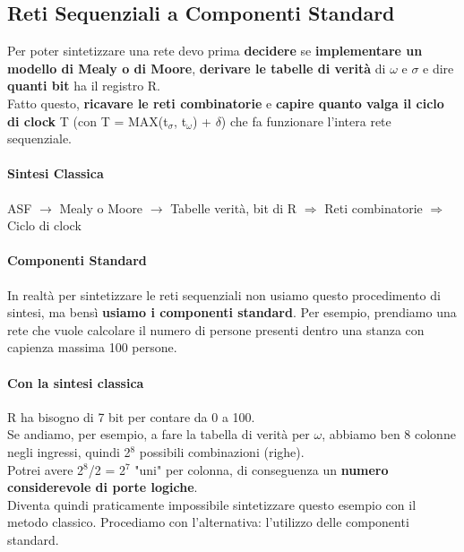 \documentclass[10pt]{report}
\begin{document}
\subsection{Reti Sequenziali a Componenti Standard}
Per poter sintetizzare una rete devo prima \textbf{decidere} se \textbf{implementare un modello di Mealy o di Moore}, \textbf{derivare le tabelle di verità} di $\omega$ e $\sigma$ e dire \textbf{quanti bit} ha il registro R.\\
Fatto questo, \textbf{ricavare le reti combinatorie} e \textbf{capire quanto valga il ciclo di clock} T (con T = MAX(t$_\sigma$, t$_\omega$) + $\delta$) che fa funzionare l'intera rete sequenziale.
\paragraph{Sintesi Classica} ASF $\longrightarrow$ Mealy o Moore $\rightarrow$ Tabelle verità, bit di R $\Rightarrow$ Reti combinatorie $\Rightarrow$ Ciclo di clock
\paragraph{Componenti Standard} In realtà per sintetizzare le reti sequenziali non usiamo questo procedimento di sintesi, ma bensì \textbf{usiamo i componenti standard}. Per esempio, prendiamo una rete che vuole calcolare il numero di persone presenti dentro una stanza con capienza massima 100 persone.
\paragraph{Con la sintesi classica} R ha bisogno di 7 bit per contare da 0 a 100.\\
Se andiamo, per esempio, a fare la tabella di verità per $\omega$, abbiamo ben 8 colonne negli ingressi, quindi 2$^8$ possibili combinazioni (righe).\\
Potrei avere 2$^8$/2 = 2$^7$ "uni" per colonna, di conseguenza un \textbf{numero considerevole di porte logiche}.\\
Diventa quindi praticamente impossibile sintetizzare questo esempio con il metodo classico. Procediamo con l'alternativa: l'utilizzo delle componenti standard.
\end{document}
